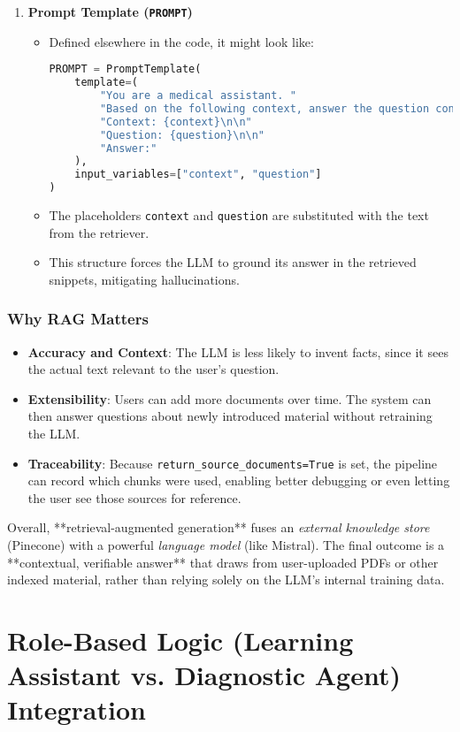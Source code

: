 \begin{enumerate}
    \item \textbf{Prompt Template (\texttt{PROMPT})}
    \begin{itemize}
        \item Defined elsewhere in the code, it might look like:
\begin{lstlisting}[language=Python]
PROMPT = PromptTemplate(
    template=(
        "You are a medical assistant. "
        "Based on the following context, answer the question concisely:\n\n"
        "Context: {context}\n\n"
        "Question: {question}\n\n"
        "Answer:"
    ),
    input_variables=["context", "question"]
)
\end{lstlisting}
        \item The placeholders \texttt{{context}} and \texttt{{question}} are substituted with the text from the retriever. 
        \item This structure forces the LLM to ground its answer in the retrieved snippets, mitigating hallucinations.
    \end{itemize}
\end{enumerate}

\subsubsection*{Why RAG Matters}
\begin{itemize}
    \item \textbf{Accuracy and Context}: The LLM is less likely to invent facts, since it sees the actual text relevant to the user’s question.
    \item \textbf{Extensibility}: Users can add more documents over time. The system can then answer questions about newly introduced material without retraining the LLM.
    \item \textbf{Traceability}: Because \texttt{return\_source\_documents=True} is set, the pipeline can record which chunks were used, enabling better debugging or even letting the user see those sources for reference.
\end{itemize}

\noindent
Overall, **retrieval-augmented generation** fuses an \textit{external knowledge store} (Pinecone) with a powerful \textit{language model} (like Mistral). The final outcome is a **contextual, verifiable answer** that draws from user-uploaded PDFs or other indexed material, rather than relying solely on the LLM’s internal training data.

\section{Role-Based Logic (Learning Assistant vs. Diagnostic Agent) Integration}
\label{sec:role-logic}

